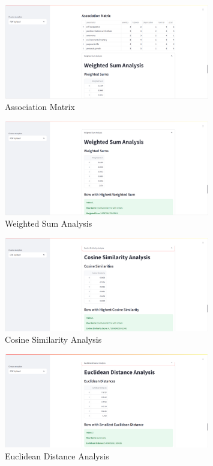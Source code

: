 \begin{figure}[h!]  
    \centering
    \includegraphics[width=0.8\textwidth]{App Images/21 Interface.png}  
    \caption{Association Matrix}
    \label{10i23445}  %
\end{figure} 

\begin{figure}[h!]  
    \centering
    \includegraphics[width=0.8\textwidth]{App Images/22 Interface.png}  
    \caption{Weighted Sum Analysis}
    \label{10i23445}  %
\end{figure} 

\pagebreak

\begin{figure}[h!]  
    \centering
    \includegraphics[width=0.8\textwidth]{App Images/23 Interface.png}  
    \caption{Cosine Similarity Analysis}
    \label{10i23445}  %
\end{figure} 

\begin{figure}[h!]  
    \centering
    \includegraphics[width=0.8\textwidth]{App Images/24 Interface.png}  
    \caption{Euclidean Distance Analysis}
    \label{10i23445}  %
\end{figure} 

